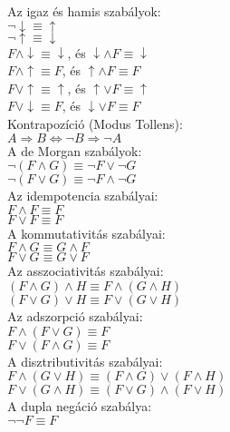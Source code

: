 \documentclass{beamer}
\newcommand{\mmedskip}{\vspace{0.5em}}
\begin{document}
\begin{frame}

\begin{tcolorbox}[title={Ekvivalens formulák}]
Az igaz és hamis szabályok:\\
${\neg}\downarrow \equiv \uparrow$\\
${\neg}\uparrow \equiv \downarrow$\\
$F \land \downarrow \equiv \downarrow$, és $\downarrow \land F \equiv \downarrow$\\
$F \land \uparrow \equiv F$, és $\uparrow \land F \equiv F$\\
$F \lor \uparrow \equiv \uparrow$, és $\uparrow \lor F \equiv \uparrow$\\
$F \lor \downarrow \equiv F$, és $\downarrow \lor F \equiv F$\\
\mmedskip
Kontrapozíció (Modus Tollens):\\
$A \Rightarrow B \iff {\neg}B \Rightarrow {\neg}A$\\
\mmedskip
A de Morgan szabályok:\\
${\neg}(F \land G) \equiv {\neg}F \lor {\neg}G$\\
${\neg}(F \lor G) \equiv {\neg}F \land {\neg}G$\\
\mmedskip
Az idempotencia szabályai:\\
$F \land F \equiv F$\\
$F \lor F \equiv F$\\
\mmedskip
A kommutativitás szabályai:\\
$F \land G \equiv G \land F$\\
$F \lor G \equiv G \lor F$\\
\mmedskip
Az asszociativitás szabályai:\\
$(F \land G) \land H \equiv F \land (G \land H)$\\
$(F \lor G) \lor H \equiv F \lor (G \lor H)$\\
\mmedskip
Az adszorpció szabályai:\\
$F \land (F \lor G) \equiv F$\\
$F \lor (F \land G) \equiv F$\\
\mmedskip
A disztributivitás szabályai:\\
$F \land (G \lor H) \equiv (F \land G) \lor (F \land H)$\\
$F \lor (G \land H) \equiv (F \lor G) \land (F \lor H)$\\
\mmedskip
A dupla negáció szabálya:\\
${\neg}{\neg}F \equiv F$
\end{tcolorbox}

\end{frame}
\end{document}
